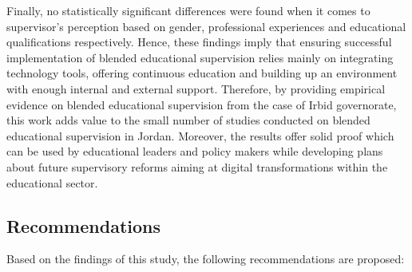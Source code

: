 \documentclass[10pt]{NSP1}
\begin{document}
Finally, no statistically significant differences were found when it comes to supervisor's perception based on gender, professional experiences and educational qualifications respectively. Hence, these findings imply that ensuring successful implementation of blended educational supervision relies mainly on integrating technology tools, offering continuous education and building up an environment with enough internal and external support. Therefore, by providing empirical evidence on blended educational supervision from the case of Irbid governorate, this work adds value to the small number of studies conducted on blended educational supervision in Jordan. Moreover, the results offer solid proof which can be used by educational leaders and policy makers while developing plans about future supervisory reforms aiming at digital transformations within the educational sector.

\subsection{Recommendations}

Based on the findings of this study, the following recommendations are proposed:
\end{document}
